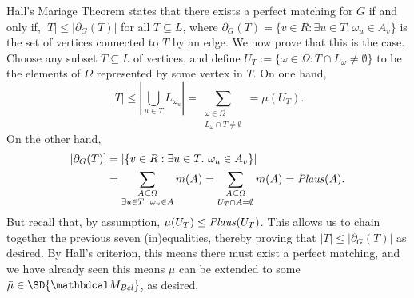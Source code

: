 \begin{subappendices}
\begin{lproof}
    Hall's Mariage Theorem states that there exists a perfect matching
    for $G$ if and only if, $|T| \le  |\partial_G(T)|$ for all $T \subseteq L$,
    where $\partial_G(T) = \{ v \in R : \exists u \in T.~\omega_u \in A_v\}$ is the set of vertices connected to $T$ by an edge. 
    We now prove that this is the case.
    Choose any subset $T \subseteq L$ of vertices, and define $U_T := \{ \omega \in \Omega : T \cap L_\omega \ne \emptyset \}$ to be the elements of $\Omega$ represented by some vertex in $T$. 
    On one hand,
    \[ 
        |T| \le | \bigcup_{u \in T} L_{\omega_u} | 
            =  \sum_{\substack{\omega \in \Omega \\ L_\omega \cap T \ne\emptyset }}
            = \mu(U_T).
    \]
    On the other hand, 
    \begin{align*}
        |\partial_G(T)] &=  |\{ v \in R : \exists u \in T.~\omega_u \in A_v \}| \\
            &= \sum_{\substack{A \subseteq \Omega \\ \exists u \in T.~ \omega_u \in A}} m(A)
            = \sum_{\substack{A \subseteq \Omega \\ U_T \cap A = \emptyset}} m(A)
            = \mathit{Plaus}(A).  
    \end{align*}
    But recall that, by assumption, $\mu(U_T) \le \mathit{Plaus}(U_T)$. 
    This allows us to 
    chain together the previous seven (in)equalities, thereby proving that $|T| \le |\partial_G(T)|$ as desired.
    By Hall's criterion, this means there must exist a perfect matching, and we have already seen this means $\mu$ can be extended to some $\bar\mu \in \SD{\dg M_{\Bel}}$, as desired.

\end{lproof}
\end{subappendices}
